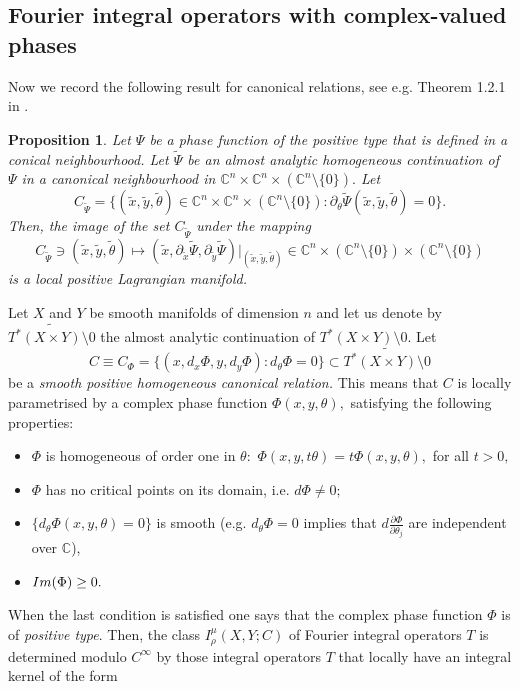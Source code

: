 \documentclass[12pt, reqno]{amsart}
\newtheorem{proposition}[theorem]{Proposition}
\theoremstyle{definition}
\theoremstyle{remark}
\numberwithin{equation}{section}
\begin{document}
\subsection{Fourier integral operators with complex-valued phases}\label{2:4}
Now we record the following result for canonical relations, see e.g. Theorem 1.2.1 in \cite{Ruzhansky:CWI-book}.
\begin{proposition}
    Let $\Psi$ be a phase function of the positive type that is defined in a conical neighbourhood. Let $\tilde{\Psi}$ be an almost analytic homogeneous continuation of $\Psi$ in a canonical neighbourhood in $\mathbb{C}^n\times \mathbb{C}^n\times ({\mathbb{C}^{n}}\setminus \{0\}).$ Let \begin{equation}
        C_{\tilde \Psi}=\{(\tilde x, \tilde y, \tilde \theta)\in \mathbb{C}^n\times \mathbb{C}^n\times ({\mathbb{C}^{n}}\setminus \{0\}):\partial_{\theta}\tilde\Psi(\tilde x, \tilde y, \tilde \theta)=0 \}.
    \end{equation}Then, the image of the set $C_{\tilde \Psi}$ under the mapping 
    \begin{equation}
      C_{\tilde \Psi}  \ni(\tilde x, \tilde y, \tilde \theta)\mapsto (\tilde x, \partial_{\tilde x}\tilde\Psi,\partial_{\tilde y}\tilde\Psi )|_{(\tilde x, \tilde y, \tilde \theta)}\in \mathbb{C}^n\times ({\mathbb{C}^{n}}\setminus \{0\})\times ({\mathbb{C}^{n}}\setminus \{0\})
    \end{equation} is a local positive Lagrangian manifold.
\end{proposition}
Let $X$ and $Y$ be smooth manifolds of dimension $n$ and let us denote by $\widetilde{ T^*(X\times Y)\setminus 0}$  the  almost analytic continuation  of  $ T^*(X\times Y)\setminus 0.$ Let   $$  C\equiv C_{\Phi}=\{(x,d_x\Phi,y, d_y\Phi):d_\theta \Phi=0\}\subset\widetilde{ T^*(X\times Y)\setminus 0}$$  be a {\it smooth positive homogeneous canonical relation.} This means that $C$ is locally parametrised by a complex phase function $\Phi(x,y,\theta),$ satisfying the following properties:
\begin{itemize}
    \item[1.] $\Phi$ is homogeneous of order one in $\theta:$  $\Phi(x,y,t\theta)=t\Phi(x,y,\theta),$ for all $t>0,$
    \item[2.] $\Phi$ has no critical points on its domain, i.e. $d\Phi\neq 0;$
    \item[3.] $\{d_\theta \Phi(x,y,\theta)=0\}$ is smooth (e.g. $d_\theta \Phi=0$ implies that $d\frac{\partial \Phi}{\partial\theta_j}$ are independent over $\mathbb{C}$),
    \item[4.] $\textnormal{Im}(\Phi)\geq 0.$
\end{itemize}When the last condition is satisfied one says that the complex phase function $\Phi$ is of {\it positive type}. Then, the class  $I^\mu_\rho(X,Y;C)$ of Fourier integral operators $T$ is determined modulo $C^{\infty}$ by those integral operators $T$ that locally have an integral  kernel of the form
\end{document}
